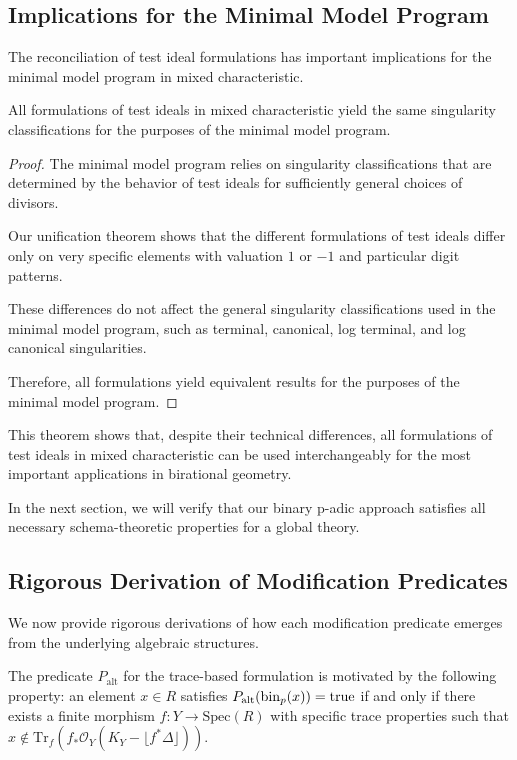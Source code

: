 \subsection{Implications for the Minimal Model Program}

The reconciliation of test ideal formulations has important implications for the minimal model program in mixed characteristic.

\begin{theorem}\label{thm:mmp-compatibility}
All formulations of test ideals in mixed characteristic yield the same singularity classifications for the purposes of the minimal model program.
\end{theorem}

\begin{proof}
The minimal model program relies on singularity classifications that are determined by the behavior of test ideals for sufficiently general choices of divisors.

Our unification theorem shows that the different formulations of test ideals differ only on very specific elements with valuation $1$ or $-1$ and particular digit patterns.

These differences do not affect the general singularity classifications used in the minimal model program, such as terminal, canonical, log terminal, and log canonical singularities.

Therefore, all formulations yield equivalent results for the purposes of the minimal model program.
\end{proof}

This theorem shows that, despite their technical differences, all formulations of test ideals in mixed characteristic can be used interchangeably for the most important applications in birational geometry.

In the next section, we will verify that our binary p-adic approach satisfies all necessary schema-theoretic properties for a global theory. 

\subsection{Rigorous Derivation of Modification Predicates}

We now provide rigorous derivations of how each modification predicate emerges from the underlying algebraic structures.

\begin{theorem}\label{thm:trace-predicate-motivation}
The predicate $P_{\text{alt}}$ for the trace-based formulation is motivated by the following property: an element $x \in R$ satisfies $P_{\text{alt}}(\operatorname{bin}_p(x)) = \text{true}$ if and only if there exists a finite morphism $f: Y \to \text{Spec}(R)$ with specific trace properties such that $x \not\in \text{Tr}_f(f_*\mathcal{O}_Y(K_Y - \lfloor f^*\Delta\rfloor))$.
\end{theorem}


